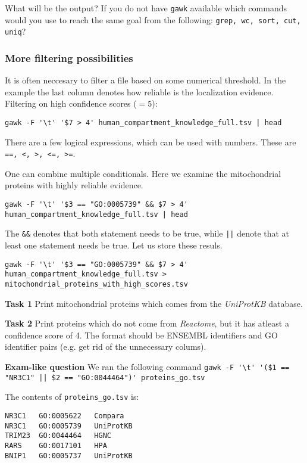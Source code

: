 \documentclass{article}\usepackage[]{graphicx}\usepackage[usenames,dvipsnames]{color}
\begin{document}
What will be the output? If you do not have \verb+gawk+ available which commands would you use to reach the same goal from the following: \verb+grep, wc, sort, cut, uniq+?

\subsubsection*{More filtering possibilities}

It is often neccesary to filter a file based on some numerical threshold. In the example the last column denotes how reliable is the localization evidence. Filtering on high confidence scores ($= 5$):

\begin{verbatim}
gawk -F '\t' '$7 > 4' human_compartment_knowledge_full.tsv | head
\end{verbatim}

There are a few logical expressions, which can be used with numbers. These are \verb+==, <, >, <=, >=+.

One can combine multiple conditionals. Here we examine the mitochondrial proteins with highly reliable evidence.

\begin{verbatim}
gawk -F '\t' '$3 == "GO:0005739" && $7 > 4' human_compartment_knowledge_full.tsv | head
\end{verbatim}

The \verb+&&+ denotes that both statement needs to be true, while \verb+||+ denote that at least one statement needs be true. Let us store these resuls.

\begin{verbatim}
gawk -F '\t' '$3 == "GO:0005739" && $7 > 4' human_compartment_knowledge_full.tsv > mitochondrial_proteins_with_high_scores.tsv
\end{verbatim}

\textbf{Task 1} Print mitochondrial proteins which comes from the \emph{UniProtKB} database.

\textbf{Task 2} Print proteins which do not come from \emph{Reactome}, but it has atleast a confidence score of 4. The format should be ENSEMBL identifiers and GO identifier pairs (e.g. get rid of the unnecessary colums).

\textbf{Exam-like question} We ran the following command \verb+gawk -F '\t' '($1 == "NR3C1" || $2 == "GO:0044464")' proteins_go.tsv+

The contents of \verb+proteins_go.tsv+ is:
\begin{verbatim}
NR3C1   GO:0005622   Compara
NR3C1   GO:0005739   UniProtKB
TRIM23  GO:0044464   HGNC
RARS    GO:0017101   HPA
BNIP1   GO:0005737   UniProtKB
\end{verbatim}
\end{document}
